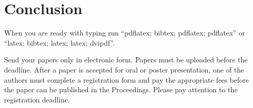 \section{Conclusion}

When you are ready with typing run ``pdflatex; bibtex; pdflatex;
pdflatex'' or ``latex; bibtex; latex; latex; dvipdf''.

Send your papers only in electronic form. Papers must be uploaded before
the deadline. After a paper is accepted for oral or poster presentation,
one of the authors must complete a registration form and pay the
appropriate fees before the paper can be published in the Proceedings.
Please pay attention to the registration deadline.